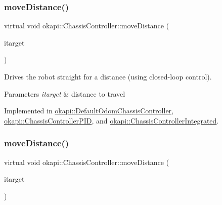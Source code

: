 \subsubsection{\texorpdfstring{moveDistance()}{moveDistance()}\hspace{0.1cm}{\footnotesize\ttfamily [1/2]}}
{\footnotesize\ttfamily virtual void okapi\+::\+Chassis\+Controller\+::move\+Distance (\begin{DoxyParamCaption}\item[{Q\+Length}]{itarget }\end{DoxyParamCaption})\hspace{0.3cm}{\ttfamily [pure virtual]}}

Drives the robot straight for a distance (using closed-\/loop control).


\begin{DoxyParams}{Parameters}
{\em itarget} & distance to travel \\
\hline
\end{DoxyParams}


Implemented in \mbox{\hyperlink{classokapi_1_1DefaultOdomChassisController_a3143bc60f72ab8ff8f63aad9a810a1c6}{okapi\+::\+Default\+Odom\+Chassis\+Controller}}, \mbox{\hyperlink{classokapi_1_1ChassisControllerPID_ab5f0409c6add9b1c3b176b61643de067}{okapi\+::\+Chassis\+Controller\+P\+ID}}, and \mbox{\hyperlink{classokapi_1_1ChassisControllerIntegrated_aa9af3fb56afdb940f92bd8016ef63925}{okapi\+::\+Chassis\+Controller\+Integrated}}.

\mbox{\label{classokapi_1_1ChassisController_a58619e777fd1b3f8e1aae871d46a8ccf}} 
\subsubsection{\texorpdfstring{moveDistance()}{moveDistance()}\hspace{0.1cm}{\footnotesize\ttfamily [2/2]}}
{\footnotesize\ttfamily virtual void okapi\+::\+Chassis\+Controller\+::move\+Distance (\begin{DoxyParamCaption}\item[{double}]{itarget }\end{DoxyParamCaption})\hspace{0.3cm}{\ttfamily [pure virtual]}}

